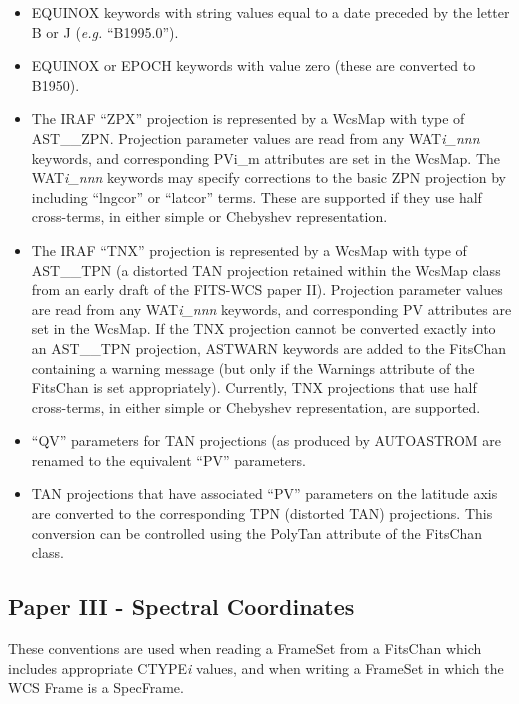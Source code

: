 \documentclass[twoside,11pt]{article}
\newcommand{\htmladdnormallink}[2]{#1}
\begin{document}
\begin{itemize}
\item EQUINOX keywords with string values equal to a date preceded
by the letter B or J (\emph{e.g.} ``B1995.0'').

\item EQUINOX or EPOCH keywords with value zero  (these are converted to
B1950).

\item The IRAF ``ZPX'' projection is represented by a
WcsMap with type of
AST\_\_ZPN. Projection parameter values are read from any WAT\emph{i\_nnn}
keywords, and corresponding PVi\_m attributes are set in the
WcsMap. The WAT\emph{i\_nnn} keywords may specify corrections to the basic
ZPN projection by including ``lngcor'' or ``latcor'' terms. These are
supported if they use half cross-terms, in either simple or Chebyshev
representation.

\item The IRAF ``TNX'' projection is represented by a WcsMap with type of
AST\_\_TPN (a distorted TAN projection retained within the WcsMap class
from an early draft of the FITS-WCS paper II). Projection parameter values
are read from any WAT\emph{i\_nnn} keywords, and corresponding PV
attributes are set in the WcsMap. If the TNX projection cannot be
converted exactly into an AST\_\_TPN projection, ASTWARN keywords are
added to the FitsChan containing a warning message (but only if the
Warnings attribute of the FitsChan is set appropriately). Currently,
TNX projections that use half cross-terms, in either simple or Chebyshev
representation, are supported.

\item ``QV'' parameters for TAN projections (as produced by
\htmladdnormallink{AUTOASTROM}{http://www.astro.gla.ac.uk/users/norman/star/autoastrom/}
are renamed to the equivalent ``PV'' parameters.

\item TAN projections that have associated ``PV'' parameters on the
latitude axis are converted to the corresponding TPN (distorted TAN)
projections. This conversion can be controlled using the PolyTan attribute
of the FitsChan class.

\end{itemize}

\subsection{Paper III - Spectral Coordinates}
These conventions are used when reading a FrameSet
from a FitsChan which includes appropriate
CTYPE\emph{i} values, and when writing a FrameSet in which
the WCS Frame is a SpecFrame.
\end{document}
